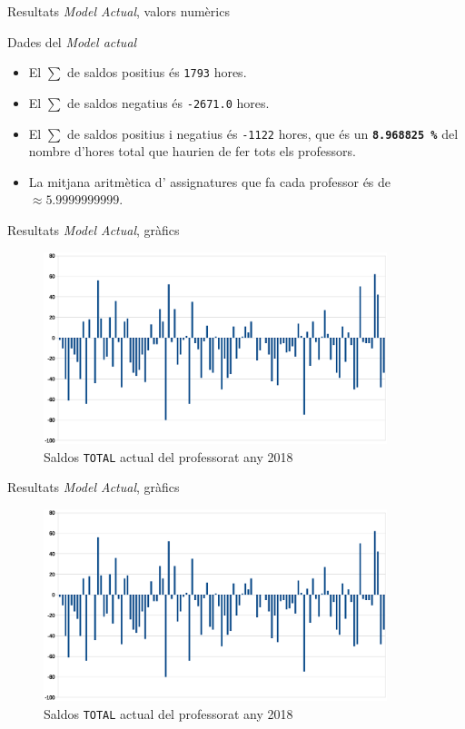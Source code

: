 \documentclass[twocolumn]{beamer}
\begin{document}
\begin{frame}{Resultats \textit{Model Actual}, valors numèrics }

\begin{block}{Dades del \textit{Model actual}}
	\begin{itemize}
		\item El $\sum$ de saldos positius és \texttt{1793} hores.	
		\item El $\sum$ de saldos negatius és \texttt{-2671.0} hores.	
		\item El $\sum$ de saldos positius i negatius  és \texttt{-1122} hores, que és un \texttt{\textbf{8.968825 \%}} del nombre d'hores total que haurien de fer tots els professors.
		\item La mitjana aritmètica d' assignatures que fa cada professor és de  $\approx 5.9999999999$. 
	\end{itemize}
\end{block}
\end{frame}





\begin{frame}{Resultats \textit{Model Actual}, gràfics}
\begin{figure}
	\includegraphics[width=10cm]{saldo_actual}
	\caption{Saldos \texttt{TOTAL} actual del professorat any 2018}
\end{figure}
\end{frame}


\begin{frame}{Resultats \textit{Model Actual}, gràfics}
\begin{figure}
	\includegraphics[width=10cm]{saldo_actual}
	\caption{Saldos \texttt{TOTAL} actual del professorat any 2018}
\end{figure}
\end{frame}
\end{document}
